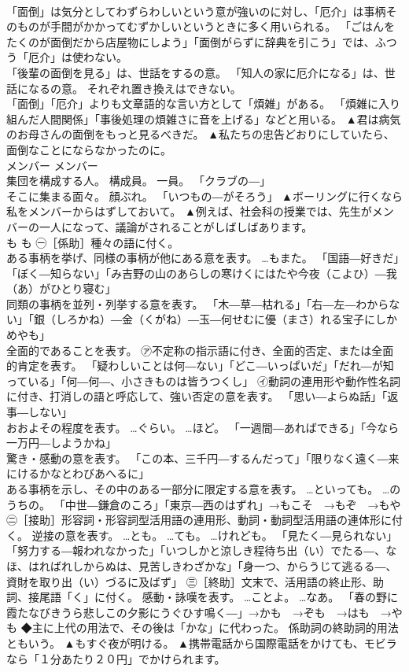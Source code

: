\documentclass[8pt]{extreport}
\begin{document}
\begin{CJK}{UTF8}{min}
\\	「面倒」は気分としてわずらわしいという意が強いのに対し、「厄介」は事柄そのものが手間がかかってむずかしいというときに多く用いられる。 「ごはんをたくのが面倒だから店屋物にしよう」「面倒がらずに辞典を引こう」では、ふつう「厄介」は使わない。 
\\	「後輩の面倒を見る」は、世話をするの意。 「知人の家に厄介になる」は、世話になるの意。 それぞれ置き換えはできない。 
\\	「面倒」「厄介」よりも文章語的な言い方として「煩雑」がある。 「煩雑に入り組んだ人間関係」「事後処理の煩雑さに音を上げる」などと用いる。	▲君は病気のお母さんの面倒をもっと見るべきだ。 ▲私たちの忠告どおりにしていたら、面倒なことにならなかったのに。
\\	メンバー	メンバー	
\\	集団を構成する人。 構成員。 一員。 「クラブの―」 
\\	そこに集まる面々。 顔ぶれ。 「いつもの―がそろう」	▲ボーリングに行くなら私をメンバーからはずしておいて。 ▲例えば、社会科の授業では、先生がメンバーの一人になって、議論がされることがしばしばあります。
\\	も	も	㊀［係助］種々の語に付く。 
\\	ある事柄を挙げ、同様の事柄が他にある意を表す。 …もまた。 「国語―好きだ」「ぼく―知らない」「み吉野の山のあらしの寒けくにはたや今夜（こよひ）―我（あ）がひとり寝む」 
\\	同類の事柄を並列・列挙する意を表す。 「木―草―枯れる」「右―左―わからない」「銀（しろかね）―金（くがね）―玉―何せむに優（まさ）れる宝子にしかめやも」 
\\	全面的であることを表す。 ㋐不定称の指示語に付き、全面的否定、または全面的肯定を表す。 「疑わしいことは何―ない」「どこ―いっぱいだ」「だれ―が知っている」「何―何―、小さきものは皆うつくし」 ㋑動詞の連用形や動作性名詞に付き、打消しの語と呼応して、強い否定の意を表す。 「思い―よらぬ話」「返事―しない」 
\\	おおよその程度を表す。 …ぐらい。 …ほど。 「一週間―あればできる」「今なら一万円―しようかね」 
\\	驚き・感動の意を表す。 「この本、三千円―するんだって」「限りなく遠く―来にけるかなとわびあへるに」 
\\	ある事柄を示し、その中のある一部分に限定する意を表す。 …といっても。 …のうちの。 「中世―鎌倉のころ」「東京―西のはずれ」→もこそ　→もぞ　→もや ㊁［接助］形容詞・形容詞型活用語の連用形、動詞・動詞型活用語の連体形に付く。 逆接の意を表す。 …とも。 …ても。 …けれども。 「見たく―見られない」「努力する―報われなかった」「いつしかと涼しき程待ち出（い）でたる―、なほ、はればれしからぬは、見苦しきわざかな」「身一つ、からうじて逃るる―、資財を取り出（い）づるに及ばず」 ㊂［終助］文末で、活用語の終止形、助詞、接尾語「く」に付く。 感動・詠嘆を表す。 …ことよ。 …なあ。 「春の野に霞たなびきうら悲しこの夕影にうぐひす鳴く―」→かも　→ぞも　→はも　→やも ◆主に上代の用法で、その後は「かな」に代わった。 係助詞の終助詞的用法ともいう。	▲もすぐ夜が明ける。 ▲携帯電話から国際電話をかけても、モビラなら「１分あたり２０円」でかけられます。

\end{CJK}
\end{document}

